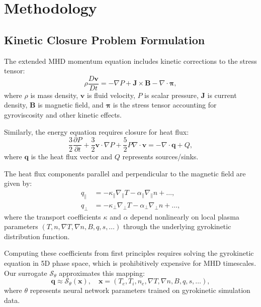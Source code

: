 \documentclass[12pt]{article}
\begin{document}
\section{Methodology}
\label{sec:methods}

\subsection{Kinetic Closure Problem Formulation}

The extended MHD momentum equation includes kinetic corrections to the stress tensor:
\begin{equation}
\rho \frac{D\mathbf{v}}{Dt} = -\nabla P + \mathbf{J} \times \mathbf{B} - \nabla \cdot \boldsymbol{\pi},
\label{eq:momentum}
\end{equation}
where $\rho$ is mass density, $\mathbf{v}$ is fluid velocity, $P$ is scalar pressure, $\mathbf{J}$ is current density, $\mathbf{B}$ is magnetic field, and $\boldsymbol{\pi}$ is the stress tensor accounting for gyroviscosity and other kinetic effects.

Similarly, the energy equation requires closure for heat flux:
\begin{equation}
\frac{3}{2}\frac{\partial P}{\partial t} + \frac{3}{2}\mathbf{v}\cdot\nabla P + \frac{5}{2}P\nabla\cdot\mathbf{v} = -\nabla\cdot\mathbf{q} + Q,
\label{eq:energy}
\end{equation}
where $\mathbf{q}$ is the heat flux vector and $Q$ represents sources/sinks.

The heat flux components parallel and perpendicular to the magnetic field are given by:
\begin{align}
q_\parallel &= -\kappa_\parallel \nabla_\parallel T - \alpha_\parallel \nabla_\parallel n + \ldots, \\
q_\perp &= -\kappa_\perp \nabla_\perp T - \alpha_\perp \nabla_\perp n + \ldots,
\end{align}
where the transport coefficients $\kappa$ and $\alpha$ depend nonlinearly on local plasma parameters $(T, n, \nabla T, \nabla n, B, q, s, \ldots)$ through the underlying gyrokinetic distribution function.

Computing these coefficients from first principles requires solving the gyrokinetic equation in 5D phase space, which is prohibitively expensive for MHD timescales. Our surrogate $\mathcal{S}_\theta$ approximates this mapping:
\begin{equation}
\mathbf{q} \approx \mathcal{S}_\theta(\mathbf{x}), \quad \mathbf{x} = (T_e, T_i, n_e, \nabla T, \nabla n, B, q, s, \ldots),
\label{eq:surrogate}
\end{equation}
where $\theta$ represents neural network parameters trained on gyrokinetic simulation data.
\end{document}
